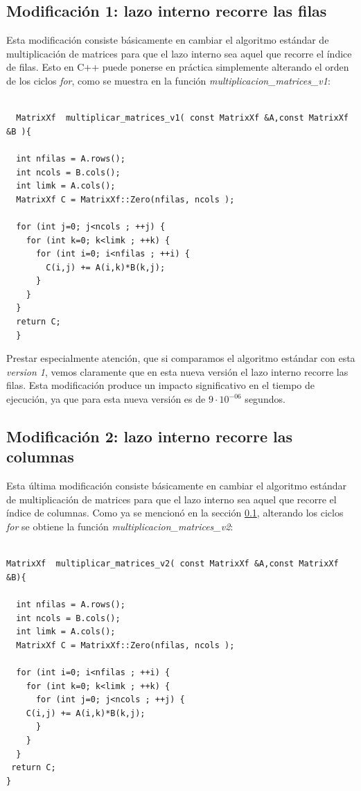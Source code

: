 \subsection{Modificación 1: lazo interno recorre las filas}
\label{sec:matricesv1}

Esta modificación consiste básicamente en cambiar el algoritmo
estándar de multiplicación de matrices para que el lazo interno sea
aquel que recorre el índice de filas. Esto en C++ puede ponerse en
práctica simplemente alterando el orden de los ciclos \emph{for}, como
se muestra en la función \emph{multiplicacion\_matrices\_v1}:

\lstset{language=C++, breaklines=true, basicstyle=\footnotesize}
\begin{lstlisting}[frame=single]

  MatrixXf  multiplicar_matrices_v1( const MatrixXf &A,const MatrixXf &B ){

  int nfilas = A.rows();
  int ncols = B.cols();
  int limk = A.cols();
  MatrixXf C = MatrixXf::Zero(nfilas, ncols );
 
  for (int j=0; j<ncols ; ++j) {
    for (int k=0; k<limk ; ++k) {
      for (int i=0; i<nfilas ; ++i) {
        C(i,j) += A(i,k)*B(k,j);
      }  
    }
  }
  return C;
  }

\end{lstlisting}

Prestar especialmente atención, que si comparamos el algoritmo
estándar con esta \emph{version 1}, vemos claramente que en esta nueva
versión el lazo interno recorre las filas. Esta modificación produce
un impacto significativo en el tiempo de ejecución, ya que para esta
nueva versión es de $9\cdot10^{-06}$ segundos.

\subsection{Modificación 2: lazo interno recorre las columnas}
\label{sec:matricesv2}

Esta última modificación consiste básicamente en cambiar el algoritmo
estándar de multiplicación de matrices para que el lazo interno sea
aquel que recorre el índice de columnas. Como ya se mencionó en la
sección \ref{sec:matricesv1}, alterando los ciclos \emph{for} se
obtiene la función \emph{multiplicacion\_matrices\_v2}:

\lstset{language=C++, breaklines=true, basicstyle=\footnotesize}
\begin{lstlisting}[frame=single]

MatrixXf  multiplicar_matrices_v2( const MatrixXf &A,const MatrixXf &B){
								 
  int nfilas = A.rows();
  int ncols = B.cols();
  int limk = A.cols();
  MatrixXf C = MatrixXf::Zero(nfilas, ncols );
 
  for (int i=0; i<nfilas ; ++i) {
    for (int k=0; k<limk ; ++k) {
      for (int j=0; j<ncols ; ++j) {
	C(i,j) += A(i,k)*B(k,j);
      }  
    }
  }
 return C;
}

\end{lstlisting}

